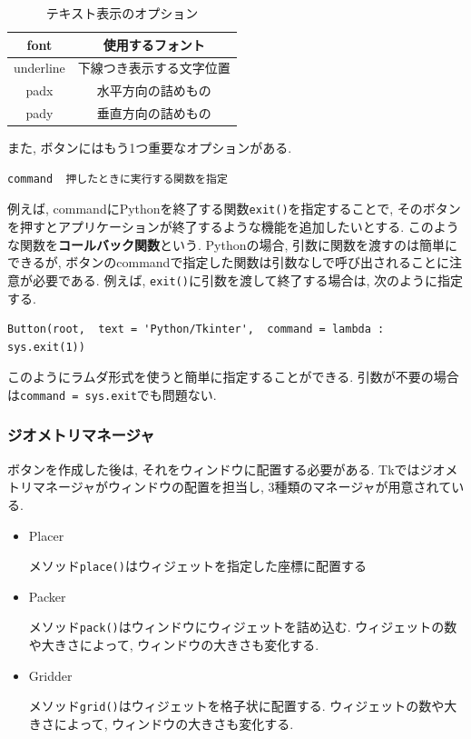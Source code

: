 \documentclass[dvipdfmx]{jsarticle}
\begin{document}
\begin{table}[H]
    \centering
    \begin{tabular}{|c|c|}
    \hline
    font	& 使用するフォント\\
    \hline
    underline	& 下線つき表示する文字位置 \\
    \hline
    padx	& 水平方向の詰めもの \\
    \hline
    pady	& 垂直方向の詰めもの \\
    \hline
    \end{tabular}
    \caption{テキスト表示のオプション}
    \label{tab:my_label}
\end{table}

また, ボタンにはもう1つ重要なオプションがある.
\begin{lstlisting}
command  押したときに実行する関数を指定
\end{lstlisting}


例えば, commandにPythonを終了する関数\verb|exit()|を指定することで, そのボタンを押すとアプリケーションが終了するような機能を追加したいとする.
このような関数を\textbf{コールバック関数}という.
Pythonの場合, 引数に関数を渡すのは簡単にできるが, ボタンのcommandで指定した関数は引数なしで呼び出されることに注意が必要である.
例えば, \verb|exit()|に引数を渡して終了する場合は, 次のように指定する.

\begin{lstlisting}
Button(root,  text = 'Python/Tkinter',  command = lambda : sys.exit(1))
\end{lstlisting}

このようにラムダ形式を使うと簡単に指定することができる.
引数が不要の場合は\verb|command = sys.exit|でも問題ない.

\subsubsection{ジオメトリマネージャ}
ボタンを作成した後は, それをウィンドウに配置する必要がある.
Tkではジオメトリマネージャがウィンドウの配置を担当し, 3種類のマネージャが用意されている.

\begin{itemize}
    \item Placer

    メソッド\verb|place()|はウィジェットを指定した座標に配置する

    \item Packer

    メソッド\verb|pack()|はウィンドウにウィジェットを詰め込む.
    ウィジェットの数や大きさによって, ウィンドウの大きさも変化する.

    \item Gridder

    メソッド\verb|grid()|はウィジェットを格子状に配置する.
    ウィジェットの数や大きさによって, ウィンドウの大きさも変化する.
\end{itemize}
\end{document}
